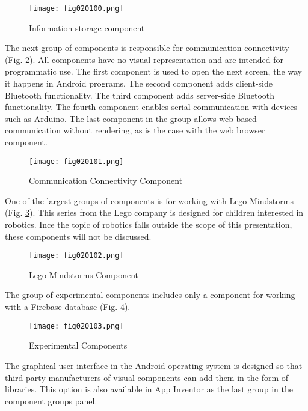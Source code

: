 \begin{figure}[H]
   \centering
   \texttt{[image: fig020100.png]}
   \caption{Information storage component}
\label{fig020100}
\end{figure}

The next group of components is responsible for communication connectivity (Fig. \ref{fig020101}). All components have no visual representation and are intended for programmatic use. The first component is used to open the next screen, the way it happens in Android programs. The second component adds client-side Bluetooth functionality. The third component adds server-side Bluetooth functionality. The fourth component enables serial communication with devices such as Arduino. The last component in the group allows web-based communication without rendering, as is the case with the web browser component.

\begin{figure}[H]
   \centering
   \texttt{[image: fig020101.png]}
   \caption{Communication Connectivity Component}
\label{fig020101}
\end{figure}

One of the largest groups of components is for working with Lego Mindstorms (Fig. \ref{fig020102}). This series from the Lego company is designed for children interested in robotics. Ince the topic of robotics falls outside the scope of this presentation, these components will not be discussed.

\begin{figure}[H]
   \centering
   \texttt{[image: fig020102.png]}
   \caption{Lego Mindstorms Component}
\label{fig020102}
\end{figure}

The group of experimental components includes only a component for working with a Firebase database (Fig. \ref{fig020103}).

\begin{figure}[H]
   \centering
   \texttt{[image: fig020103.png]}
   \caption{Experimental Components}
\label{fig020103}
\end{figure}

The graphical user interface in the Android operating system is designed so that third-party manufacturers of visual components can add them in the form of libraries. This option is also available in App Inventor as the last group in the component groups panel.

